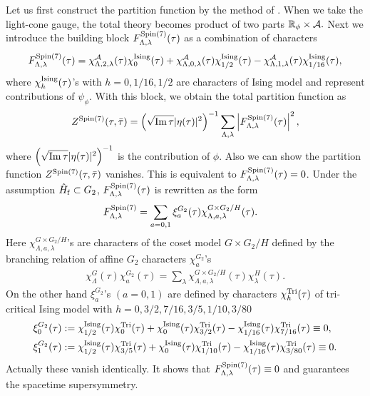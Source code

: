 \documentclass[a4paper,12pt]{article}
\numberwithin{equation}{section}
\newcommand{\Rb}{\mathbb{R}}
\newcommand{\Acal}{{\cal A}}
\newcommand{\taub}{\bar{\tau}}
\newcommand{\im}{{\rm Im}\,}
\newcommand{\G}[1]{\mbox{$G_{#1}$}}
\newcommand{\Spin}[1]{{\rm Spin}(#1)}
\newcommand{\psil}{\psi_{\phi}}
\newcommand{\Hf}{\hat{H}_{\rm f}}
\newcommand{\isi}{{\rm Ising}}
\newcommand{\tri}{{\rm Tri}}
\begin{document}
Let us first construct the partition function 
by the method of
\cite{Eguchi:2001ip}. When we take the light-cone gauge, 
the total theory
becomes product of two parts
$ \Rb_{\phi}\times \Acal.$
Next we introduce the building block $F^{\Spin7}_{\Lambda,\lambda}(\tau)$ as
a combination of characters
\begin{align*}
 F^{\Spin7}_{\Lambda,\lambda}(\tau)=
    \chi^{\Acal}_{\Lambda,2,\lambda}(\tau)\chi^{\isi}_{0}(\tau)
   +\chi^{\Acal}_{\Lambda,0,\lambda}(\tau)\chi^{\isi}_{1/2}(\tau)
   -\chi^{\Acal}_{\Lambda,1,\lambda}(\tau)\chi^{\isi}_{1/16}(\tau),
\end{align*}
where $\chi^{\isi}_{h}(\tau)$'s with 
$h=0,1/16,1/2$ are characters of Ising model
and represent contributions of $\psil$. With this block, 
we obtain the total partition function as
\begin{align*}
 Z^{\Spin7}(\tau,\taub)=\left(\sqrt{\im \tau}|\eta(\tau)|^2\right)^{-1}
\sum_{\Lambda,\lambda}\left|F^{\Spin7}_{\Lambda,\lambda}(\tau)\right|^2,
\end{align*}
where $\left(\sqrt{\im \tau}|\eta(\tau)|^2\right)^{-1}$ is the
contribution of $\phi$.
Also we can show the partition function 
$Z^{\Spin7}(\tau,\taub)$ 
vanishes.
This is equivalent to $F^{\Spin7}_{\Lambda,\lambda}(\tau)=0$. 
Under the assumption
$\Hf \subset \G2$, $F^{\Spin7}_{\Lambda,\lambda}(\tau)$
is rewritten as the form
\begin{align}
 F^{\Spin7}_{\Lambda,\lambda}&=\sum_{a=0,1}\xi^{G_2}_{a}(\tau)
\chi^{G\times G_2/H}_{\Lambda,a,\lambda}(\tau).\label{Spin7id}
\end{align}
Here $\chi^{G\times
G_2/H}_{\Lambda,a,\lambda}$'s are characters of the coset model
$G\times G_2/H$ defined by the branching relation
of affine \G2 characters $\chi^{G_2}_{a}$'s
\begin{align*}
 \chi^{G}_{\Lambda}(\tau)\chi^{G_2}_{a}(\tau)=\sum_{\lambda}\chi^{G\times
G_2/H}_{\Lambda,a,\lambda}(\tau)\chi^{H}_{\lambda}(\tau).
\end{align*}
On the other hand 
$\xi^{G_2}_{a}$'s $( a=0,1)$ are defined by characters 
$\chi^{\tri}_h(\tau)$ of 
tri-critical Ising model with $h=0,3/2,7/16,3/5,1/10,3/80$ 
\begin{align}
 &\xi^{G_2}_{0}(\tau):=\chi^{\isi}_{1/2}(\tau)\chi^{\tri}_{0}(\tau)
     +\chi^{\isi}_{0}(\tau)\chi^{\tri}_{3/2}(\tau)
    -\chi^{\isi}_{1/16}(\tau)\chi^{\tri}_{7/16}(\tau)\equiv 0,\nonumber\\
 &\xi^{G_2}_{1}(\tau):=\chi^{\isi}_{1/2}(\tau)\chi^{\tri}_{3/5}(\tau)
   +\chi^{\isi}_{0}(\tau)\chi^{\tri}_{1/10}(\tau)
 -\chi^{\isi}_{1/16}(\tau)\chi^{\tri}_{3/80}(\tau)\equiv 0. \label{xiG2}
\end{align}
Actually these vanish identically. 
It shows that $F^{\Spin7}_{\Lambda,\lambda}(\tau)\equiv 0$ and 
guarantees the spacetime supersymmetry.
\end{document}
